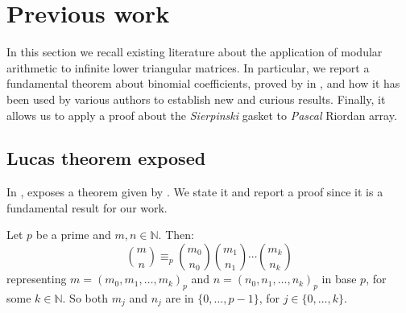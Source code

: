 
\section{Previous work}

In this section we recall existing literature about the application of modular
arithmetic to infinite lower triangular matrices. In particular, we report a
fundamental theorem about binomial coefficients, proved by
\citeauthor{lucas:theorie:des:nombres} in \cite{lucas:theorie:des:nombres}, and
how it has been used by various authors to establish new and curious results.
Finally, it allows us to apply a proof about the \emph{Sierpinski} gasket to 
\emph{Pascal} Riordan array.

\subsection{Lucas theorem exposed}

In \cite{fine:1947}, \citeauthor{fine:1947} exposes a theorem given by
\citeauthor{lucas:theorie:des:nombres}. We state it and report a proof since
it is a fundamental result for our work. 
\begin{theorem}
    Let $p$ be a prime and $m,n\in\mathbb{N}$. Then:
    \begin{displaymath}
        {{m}\choose{n}} \equiv_{p} 
            {{m_{0}}\choose{n_{0}}} 
            {{m_{1}}\choose{n_{1}}} 
            \cdots 
            {{m_{k}}\choose{n_{k}}} 
    \end{displaymath}
    representing $m=\left(m_{0},m_{1},\ldots,m_{k}\right)_{p}$ and
    $n=\left(n_{0},n_{1},\ldots,n_{k}\right)_{p}$ in base $p$, for some $k\in\mathbb{N}$.
    So both $m_{j}$ and $n_{j}$ are in $\lbrace 0,\ldots, p-1 \rbrace$, for
    $j\in\lbrace 0,\ldots,k\rbrace$.
    \label{thm:lucas:theorem}
\end{theorem}

